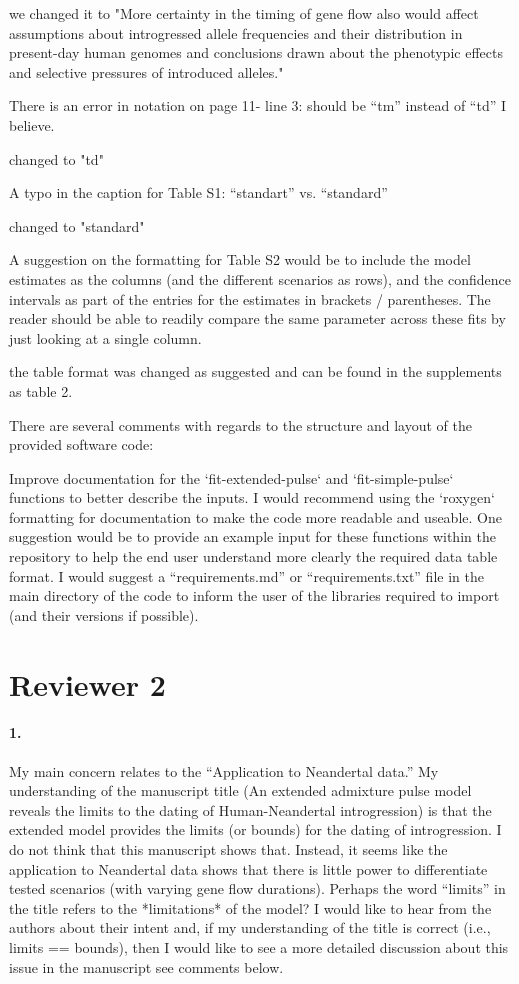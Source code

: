 \documentclass[11pt]{article}
\let\oldparagraph\paragraph
\renewcommand{\paragraph}[1]{\oldparagraph{#1}\mbox{}}
\begin{document}
 we changed it to "More certainty in the timing of gene flow also would affect  assumptions about introgressed allele frequencies and their distribution in present-day human genomes and conclusions drawn about the phenotypic effects and selective pressures of introduced alleles."

There is an error in notation on page 11- line 3: should be “tm” instead of “td” I believe.

 changed to "td"

A typo in the caption for Table S1: “standart” vs. “standard”

 changed to "standard"

A suggestion on the formatting for Table S2 would be to include the model estimates as the columns (and the different scenarios as rows), and the confidence intervals as part of the entries for the estimates in brackets / parentheses. The reader should be able to readily compare the same parameter across these fits by just looking at a single column. 

 the table format was changed as suggested and can be found in the supplements as table 2.

There are several comments with regards to the structure and layout of the provided software code:

Improve documentation for the `fit-extended-pulse` and `fit-simple-pulse` functions to better describe the inputs. I would recommend using the `roxygen` formatting for documentation to make the code more readable and useable. 
One suggestion would be to provide an example input for these functions within the repository to help the end user understand more clearly the required data table format. 
I would suggest a “requirements.md” or “requirements.txt” file in the main directory of the code to inform the user of the libraries required to import (and their versions if possible).

\section{Reviewer 2}\label{Reviewer 2}

\paragraph{1.}
My main concern relates to the “Application to Neandertal data.” My understanding of the manuscript title (An extended admixture pulse model reveals the limits to the dating of Human-Neandertal introgression) is that the extended model provides the limits (or bounds) for the dating of introgression. I do not think that this manuscript shows that. Instead, it seems like the application to Neandertal data shows that there is little power to differentiate tested scenarios (with varying gene flow durations). Perhaps the word “limits” in the title refers to the *limitations* of the model? I would like to hear from the authors about their intent and, if my understanding of the title is correct (i.e., limits == bounds), then I would like to see a more detailed discussion about this issue in the manuscript see comments below.
\end{document}
